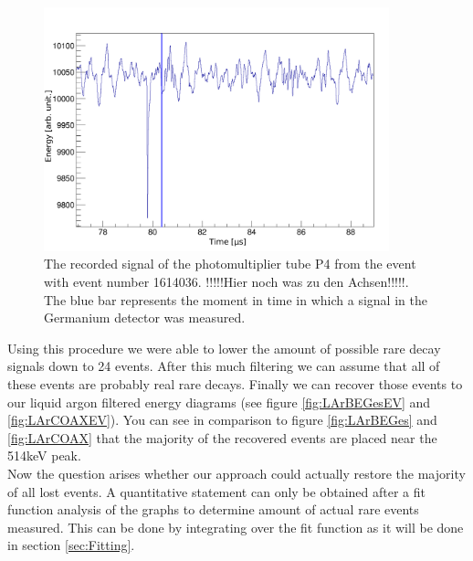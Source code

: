 \begin{figure}[t!]
	\centering
	\ifmakefigures%
	\includegraphics[width=100mm]{./Bilder/BeispielSignal.png}
	\fi%
	\caption{\label{fig:Trigger4}
    The recorded signal of the photomultiplier tube P4 from the event with event number 1614036. !!!!!Hier noch was zu den Achsen!!!!!. 
    The blue bar represents the moment in time in which a signal in the Germanium detector was measured.
	}
\end{figure}

Using this procedure we were able to lower the amount of possible rare  decay signals down to 24 events.
After this much filtering we can assume that all of these events are probably real rare  decays.
Finally we can recover those events to our liquid argon filtered energy diagrams (see figure \ref{fig:LArBEGesEV} and \ref{fig:LArCOAXEV}).
You can see in comparison to figure \ref{fig:LArBEGes} and \ref{fig:LArCOAX} that the majority of the recovered events are placed near the 514keV peak.
\\

Now the question arises whether our approach could actually restore the majority of all lost  events.
A quantitative statement can only be obtained after a fit function analysis of the graphs to determine amount of actual rare  events measured.
This can be done by integrating over the fit function as it will be done in section \ref{sec:Fitting}.
\\

